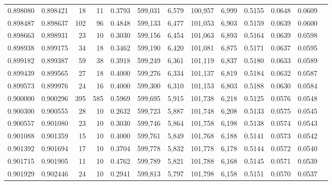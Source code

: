 \begin{tabular}{rrrrrrrrrrrrr}
0.898080 & 0.898421 &    18 &  11 &                                     0.3793 & 599,031 &   6,579 & 100,957 &   6,999 & 0.5155 & 0.0648 & 0.0609 \\
0.898487 & 0.898637 &   102 &  96 &                                     0.4848 & 599,133 &   6,477 & 101,053 &   6,903 & 0.5159 & 0.0639 & 0.0600 \\
0.898663 & 0.898931 &    23 &  10 &                                     0.3030 & 599,156 &   6,454 & 101,063 &   6,893 & 0.5164 & 0.0639 & 0.0598 \\
0.898938 & 0.899175 &    34 &  18 &                                     0.3462 & 599,190 &   6,420 & 101,081 &   6,875 & 0.5171 & 0.0637 & 0.0595 \\
0.899182 & 0.899387 &    59 &  38 &                                     0.3918 & 599,249 &   6,361 & 101,119 &   6,837 & 0.5180 & 0.0633 & 0.0589 \\
0.899439 & 0.899565 &    27 &  18 &                                     0.4000 & 599,276 &   6,334 & 101,137 &   6,819 & 0.5184 & 0.0632 & 0.0587 \\
0.899573 & 0.899976 &    24 &  16 &                                     0.4000 & 599,300 &   6,310 & 101,153 &   6,803 & 0.5188 & 0.0630 & 0.0584 \\
0.900000 & 0.900296 &   395 & 585 &                                     0.5969 & 599,695 &   5,915 & 101,738 &   6,218 & 0.5125 & 0.0576 & 0.0548 \\
0.900300 & 0.900555 &    28 &  10 &                                     0.2632 & 599,723 &   5,887 & 101,748 &   6,208 & 0.5133 & 0.0575 & 0.0545 \\
0.900557 & 0.901080 &    23 &  10 &                                     0.3030 & 599,746 &   5,864 & 101,758 &   6,198 & 0.5138 & 0.0574 & 0.0543 \\
0.901088 & 0.901359 &    15 &  10 &                                     0.4000 & 599,761 &   5,849 & 101,768 &   6,188 & 0.5141 & 0.0573 & 0.0542 \\
0.901392 & 0.901694 &    17 &  10 &                                     0.3704 & 599,778 &   5,832 & 101,778 &   6,178 & 0.5144 & 0.0572 & 0.0540 \\
0.901715 & 0.901905 &    11 &  10 &                                     0.4762 & 599,789 &   5,821 & 101,788 &   6,168 & 0.5145 & 0.0571 & 0.0539 \\
0.901929 & 0.902446 &    24 &  10 &                                     0.2941 & 599,813 &   5,797 & 101,798 &   6,158 & 0.5151 & 0.0570 & 0.0537 \\

\end{tabular}
